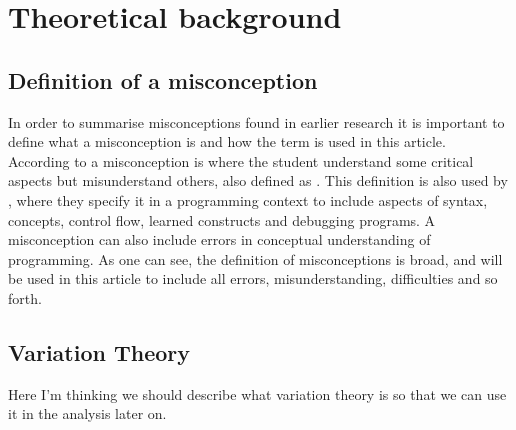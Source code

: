 \section{Theoretical background}

\subsection{Definition of a misconception}

In order to summarise misconceptions found in earlier research it is 
important to define what a misconception is and how the term is used in this 
article. According to \textcite{NCOL} a misconception is where the student 
understand some critical aspects but misunderstand others, also defined as 
. This definition is also used by 
\textcite{MisconceptionsSurvey2017}, where they specify it in a programming 
context to include aspects of syntax, concepts, control flow, learned 
constructs and debugging programs. A misconception can also include errors in 
conceptual understanding of programming. As one can see, the definition of 
misconceptions is broad, and will be used in this article to include all 
errors, misunderstanding, difficulties and so forth. 

\subsection{Variation Theory}

Here I'm thinking we should describe what variation theory is so that we can 
use it in the analysis later on.